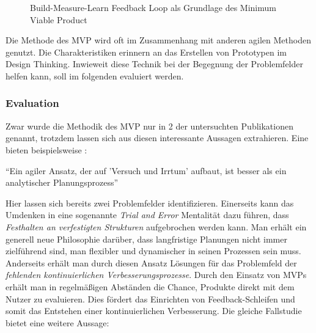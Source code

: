 \begin{figure}[H]
	\centering
	\caption[Build-Measure-Learn Feedback Loop als Grundlage des Minimum Viable Product]{Build-Measure-Learn Feedback Loop als Grundlage des Minimum Viable Product \protect \cite[S. 103]{grote_fuhrungsinstrumente_2018}}
	\label{fig:mvploop}
\end{figure}

Die Methode des MVP wird oft im Zusammenhang mit anderen agilen Methoden genutzt. Die Charakteristiken erinnern an das Erstellen von Prototypen im Design Thinking. Inwieweit diese Technik bei der Begegnung der Problemfelder helfen kann, soll im folgenden evaluiert werden.

\subsubsection{Evaluation}

Zwar wurde die Methodik des MVP nur in 2 der untersuchten Publikationen genannt, trotzdem lassen sich aus diesen interessante Aussagen extrahieren. Eine bieten beispielsweise :

\begin{center}
	``Ein agiler Ansatz, der auf 'Versuch und Irrtum' aufbaut, ist besser als ein analytischer Planungsprozess'' \cite[S. 15]{chanias_digital_2018}
\end{center}

Hier lassen sich bereits zwei Problemfelder identifizieren. Einerseits kann das Umdenken in eine sogenannte \textit{Trial and Error} Mentalität dazu führen, dass \textit{Festhalten an verfestigten Strukturen} aufgebrochen werden kann. Man erhält ein generell neue Philosophie darüber, dass langfristige Planungen nicht immer zielführend sind, man flexibler und dynamischer in seinen Prozessen sein muss. Anderseits erhält man durch diesen Ansatz Lösungen für das Problemfeld der \textit{fehlenden kontinuierlichen Verbesserungsprozesse}. Durch den Einsatz von MVPs erhält man in regelmäßigen Abständen die Chance, Produkte direkt mit dem Nutzer zu evaluieren. Dies fördert das Einrichten von Feedback-Schleifen und somit das Entstehen einer kontinuierlichen Verbesserung. Die gleiche Fallstudie bietet eine weitere Aussage:

